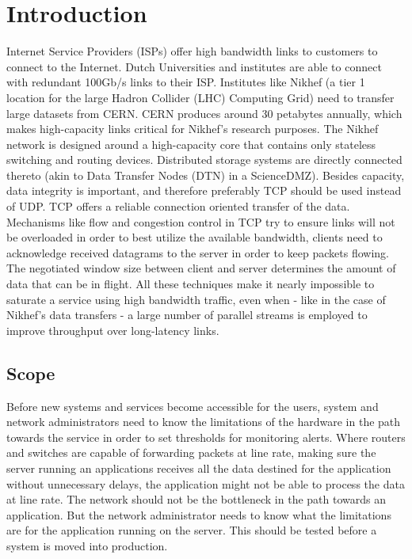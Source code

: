 \chapter{Introduction}\label{ch:intro}
Internet Service Providers (ISPs) offer high bandwidth links to customers to connect to the Internet. Dutch Universities and institutes are able to connect with redundant 100Gb/s links to their ISP.
Institutes like Nikhef (a tier 1 location for the large Hadron Collider (LHC) Computing Grid) need to transfer large datasets from CERN. CERN produces around 30 petabytes annually\cite{cerndata}, which makes high-capacity links critical for Nikhef's research purposes.
The Nikhef network is designed around a high-capacity core that contains only stateless switching and routing devices. Distributed storage systems are directly connected thereto (akin to Data Transfer Nodes (DTN) in a ScienceDMZ\cite{sciencedmz}).
Besides capacity, data integrity is important, and therefore preferably TCP should be used instead of UDP. TCP offers a reliable connection oriented transfer of the data. 
Mechanisms like flow and congestion control in TCP try to ensure links will not be overloaded in order to best utilize the available bandwidth, clients need to acknowledge received datagrams to the server in order to keep packets flowing. 
The negotiated window size between client and server determines the amount of data that can be in flight.  
All these techniques make it nearly impossible to saturate a service using high bandwidth traffic, even when - like in the case of Nikhef's data transfers - a large number of parallel streams is employed to improve throughput over long-latency links.

\section{Scope}\label{sec:scope}

Before new systems and services become accessible for the users, system and network administrators need to know the limitations of the hardware in the path towards the service in order to set thresholds for monitoring alerts.
Where routers and switches are capable of forwarding packets at line rate, making sure the server running an applications receives all the data destined for the application without unnecessary delays, 
the application might not be able to process the data at line rate.
The network should not be the bottleneck in the path towards an application. But the network administrator needs to know what the limitations are for the application running on the server. 
This should be tested before a system is moved into production. 

